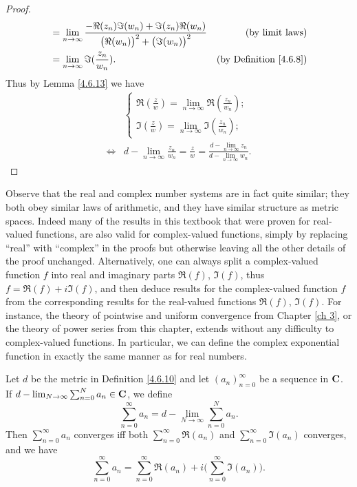 \begin{proof}
\begin{align*}
                         & = \lim_{n \to \infty} \frac{- \Re(z_n) \Im(w_n) + \Im(z_n) \Re(w_n)}{\big(\Re(w_n)\big)^2 + \big(\Im(w_n)\big)^2} & \text{(by limit laws)}             \\
                         & = \lim_{n \to \infty} \Im(\frac{z_n}{w_n}).                                                                       & \text{(by Definition \ref{4.6.8})}
    \end{align*}
    Thus by Lemma \ref{4.6.13} we have
    \begin{align*}
             & \begin{cases}
                   \Re(\frac{z}{w}) = \lim_{n \to \infty} \Re(\frac{z_n}{w_n}); \\
                   \Im(\frac{z}{w}) = \lim_{n \to \infty} \Im(\frac{z_n}{w_n});
               \end{cases}                                                             \\
        \iff & d - \lim_{n \to \infty} \frac{z_n}{w_n} = \frac{z}{w} = \frac{d - \lim_{n \to \infty} z_n}{d - \lim_{n \to \infty} w_n}.
    \end{align*}
\end{proof}

\begin{note}
    Observe that the real and complex number systems are in fact quite similar;
    they both obey similar laws of arithmetic, and they have similar structure as metric spaces.
    Indeed many of the results in this textbook that were proven for real-valued functions, are also valid for complex-valued functions, simply by replacing ``real'' with ``complex'' in the proofs but otherwise leaving all the other details of the proof unchanged.
    Alternatively, one can always split a complex-valued function \(f\) into real and imaginary parts \(\Re(f)\), \(\Im(f)\), thus \(f = \Re(f) + i \Im(f)\), and then deduce results for the complex-valued function \(f\) from the corresponding results for the real-valued functions \(\Re(f)\), \(\Im(f)\).
    For instance, the theory of pointwise and uniform convergence from Chapter \ref{ch 3}, or the theory of power series from this chapter, extends without any difficulty to complex-valued functions.
    In particular, we can define the complex exponential function in exactly the same manner as for real numbers.
\end{note}

\begin{additional corollary}\label{ac 4.6.6}
Let \(d\) be the metric in Definition \ref{4.6.10} and let \((a_n)_{n = 0}^\infty\) be a sequence in \(\mathbf{C}\).
If \(d - \lim_{N \to \infty} \sum_{n = 0}^N a_n \in \mathbf{C}\), we define
\[
    \sum_{n = 0}^\infty a_n = d - \lim_{N \to \infty} \sum_{n = 0}^N a_n.
\]
Then \(\sum_{n = 0}^\infty a_n\) converges iff both \(\sum_{n = 0}^\infty \Re(a_n)\) and \(\sum_{n = 0}^\infty \Im(a_n)\) converges, and we have
\[
    \sum_{n = 0}^\infty a_n = \sum_{n = 0}^\infty \Re(a_n) + i \bigg(\sum_{n = 0}^\infty \Im(a_n)\bigg).
\]
\end{additional corollary}

